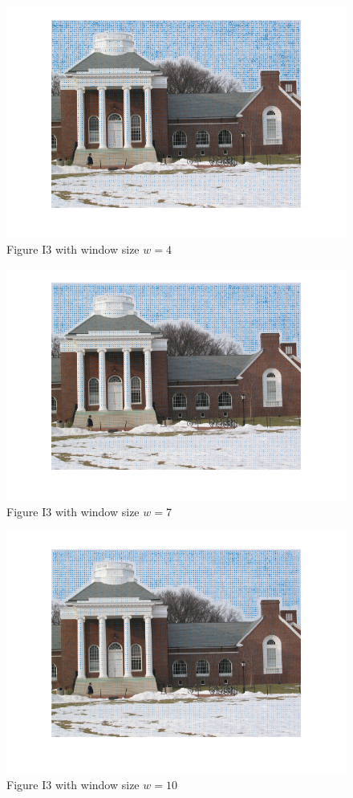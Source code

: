 \documentclass[letterpaper]{article}
\begin{document}
\begin{figure}[H]
\centering
\includegraphics[scale=0.7]{I3w4.png}
\caption{Figure I3 with window size $w = 4$}
\label{I3w4}
\end{figure}
\begin{figure}[H]
\centering
\includegraphics[scale=0.7]{I3w7.png}
\caption{Figure I3 with window size $w = 7$}
\label{I3w7}
\end{figure}
\begin{figure}[H]
\centering
\includegraphics[scale=0.7]{I3w10.png}
\caption{Figure I3 with window size $w = 10$}
\label{I3w10}
\end{figure}
\end{document}
